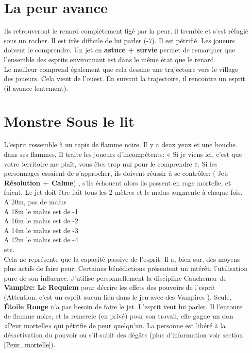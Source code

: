 \documentclass[oneside,12pt]{book}
\newcommand\roll[1]{
( Jet: \textbf{#1})
}
\newcommand{\Lynn}{\textbf{Étoile Rouge} }
\begin{document}
\begin{flushleft}
\section{La peur avance}
Ils retrouveront le renard complètement figé par la peur, il tremble et s'est réfugié sous un rocher. Il est très difficile de lui parler (-7). Il est pétrifié. Les joueurs doivent le comprendre. Un jet en \textbf{astuce + survie} permet de remarquer que l’ensemble des esprits environnant est dans le même état que le renard.\\
Le meilleur comprend également que cela dessine une trajectoire vers le village des joueurs. Cela vient de l'ouest. En suivant la trajectoire, il rencontre un esprit (il avance lentement). 

\section{Monstre Sous le lit}
L'esprit ressemble à un tapis de flamme noire. Il y a deux yeux et une bouche dans ses flammes. Il traite les joueurs d'incompétents: « Si je viens ici, c'est que votre territoire me plaît, vous êtes trop nul pour le comprendre ».
Si les personnages essaient de s'approcher, ils doivent réussir à se contrôler:  \roll{Résolution + Calme}, s'ils échouent alors ils passent en rage mortelle, et fuient. 
Le jet doit être fait tous les 2 mètres et le malus augmente à chaque fois. 
A 20m, pas de malus\\
A 18m le malus est de -1\\
A 16m le malus est de -2\\
A 14m le malus est de -3\\
A 12m le malus est de -4\\
etc.\\
Cela ne représente que la capacité passive de l'esprit. Il a, bien sur, des moyens plus actifs de faire peur. Certaines bénédictions présentent un intérêt, l'utilisation pure de son influence. J'utilise personnellement la discipline Cauchemar de \textbf{Vampire: Le Requiem} pour décrire les effets des pouvoirs de l'esprit (Attention, c'est un esprit aucun lien dans le jeu avec des Vampires ).
Seule, \Lynn n'a pas besoin de faire le jet. L'esprit veut lui parler. 
Il l'entoure de flamme noire, et la remercie (en privé) pour son travail, elle gagne un don «Peur mortelle»  qui pétrifie de peur quelqu'un. La personne est libéré à la désactivation du pouvoir ou s'il subit des dégâts (plus d'information voir section \ref{Peur_mortelle}).\\

\end{flushleft}
\end{document}
